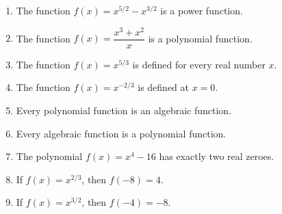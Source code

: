 \documentclass[12pt]{article}
\begin{document}
\begin{enumerate}
\begin{enumerate}
				\item The function $f(x)=x^{5/2}-x^{3/2}$ is a power function.
			
				\item The function $f(x)=\dfrac{x^3+x^2}{x}$ is a polynomial function.
				
				\item The function $f(x)=x^{5/3}$ is defined for every real number $x$.				
				
				\item The function $f(x)=x^{-2/3}$ is defined at $x=0$.
				
				
				\item Every polynomial function is an algebraic function.
				
				\item Every algebraic function is a polynomial function. 
				
				
				\item The polynomial $f(x)=x^4-16$
				has exactly two real zeroes.
			
				\item If $f(x)=x^{2/3}$, then $f(-8)=4.$
			
				\item If $f(x)=x^{3/2}$, then $f(-4)=-8.$
				
		\end{enumerate}
		
	\end{enumerate}
	
\end{document}
